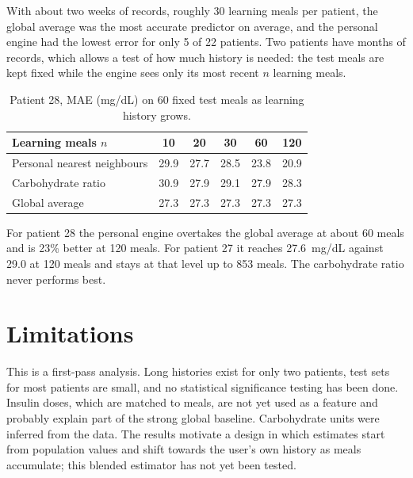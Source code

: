 With about two weeks of records, roughly 30 learning meals per patient, the global average was the most accurate predictor on average, and the personal engine had the lowest error for only 5 of 22 patients. Two patients have months of records, which allows a test of how much history is needed: the test meals are kept fixed while the engine sees only its most recent $n$ learning meals.

\begin{table}[h]
\centering
\begin{tabular}{lccccc}
\hline
Learning meals $n$ & 10 & 20 & 30 & 60 & 120 \\
\hline
Personal nearest neighbours & 29.9 & 27.7 & 28.5 & 23.8 & 20.9 \\
Carbohydrate ratio & 30.9 & 27.9 & 29.1 & 27.9 & 28.3 \\
Global average & 27.3 & 27.3 & 27.3 & 27.3 & 27.3 \\
\hline
\end{tabular}
\caption{Patient 28, MAE (mg/dL) on 60 fixed test meals as learning history grows.}
\end{table}

For patient 28 the personal engine overtakes the global average at about 60 meals and is 23\% better at 120 meals. For patient 27 it reaches 27.6~mg/dL against 29.0 at 120 meals and stays at that level up to 853 meals. The carbohydrate ratio never performs best.

\section{Limitations}
This is a first-pass analysis. Long histories exist for only two patients, test sets for most patients are small, and no statistical significance testing has been done. Insulin doses, which are matched to meals, are not yet used as a feature and probably explain part of the strong global baseline. Carbohydrate units were inferred from the data. The results motivate a design in which estimates start from population values and shift towards the user's own history as meals accumulate; this blended estimator has not yet been tested.
